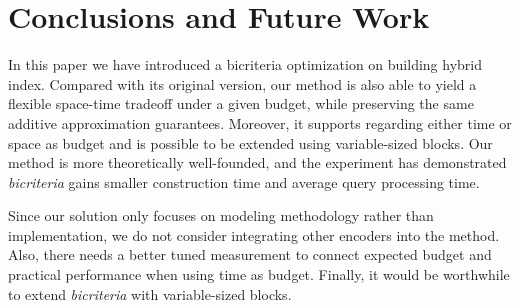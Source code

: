 \documentclass{sig-alternate-05-2015}
\begin{document}
\section{Conclusions and Future Work}
In this paper we have introduced a bicriteria optimization on building hybrid index.
Compared with its original version, our method is also able to yield a flexible space-time tradeoff under a given budget, while preserving the same additive approximation guarantees.
Moreover, it supports regarding either time or space as budget and is possible to be extended using variable-sized blocks.
Our method is more theoretically well-founded, and the experiment has demonstrated \textit{bicriteria} gains smaller construction time and average query processing time.

Since our solution only focuses on modeling methodology rather than implementation, we do not consider integrating other encoders into the method.
Also, there needs a better tuned measurement to connect expected budget and practical performance when using time as budget.
Finally, it would be worthwhile to extend \textit{bicriteria} with variable-sized blocks.


\balance


%
\end{document}
